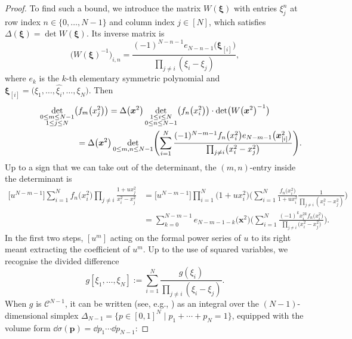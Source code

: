 \begin{proof}
To find such a bound, we introduce the matrix $W(\boldsymbol{\xi})$ with entries $\xi_j^{n}$ at row index $n \in \{0,\dots,N - 1\}$ and column index $j \in [N]$, which satisfies $\Delta(\boldsymbol{\xi}) = \det W(\boldsymbol{\xi})$. Its inverse matrix is
\[
\bigl(W(\boldsymbol{\xi})^{-1}\bigr)_{i,n} = \frac{(-1)^{N - n - 1}e_{N - n - 1}\bigl(\boldsymbol{\xi}_{[i]}\bigr)}{\prod_{j \neq i} (\xi_i - \xi_j)},
\]
where $e_k$ is the $k$-th elementary symmetric polynomial and $\boldsymbol{\xi}_{[i]} = \bigl(\xi_1,\dots,\widehat{\xi_i},\dots,\xi_N\bigr)$. Then
\begin{gather}
\nonumber \mathop{\det}_{\substack{0 \leq m \leq N - 1 \\ 1 \leq j \leq N }} \bigl(f_m\bigl(x_j^2\bigr)\bigr) = \Delta\bigl(\boldsymbol{x}^2\bigr) \det_{\substack{1 \leq i \leq N \\ 0 \leq n \leq N - 1}} \bigl(f_n\bigl(x_i^2\bigr)\bigr) \cdot \det \bigl(W\bigl(\boldsymbol{x}^2\bigr)^{-1}\bigr) \\
\hphantom{\mathop{\det}_{\substack{0 \leq m \leq N - 1 \\ 1 \leq j \leq N }} \bigl(f_m\bigl(x_j^2\bigr)\bigr)}{} = \Delta\bigl(\boldsymbol{x}^2\bigr) \det_{0 \leq m,n \leq N - 1} \Biggl(\sum_{i = 1}^{N} \frac{(-1)^{N - m - 1} f_n\bigl(x_i^2\bigr) e_{N - m - 1}\bigl(\boldsymbol{x}^2_{[i]}\bigr)}{\prod_{j \neq i} \bigl(x_i^2 - x_j^2\bigr)}\Biggr).\label{26}
\end{gather}
Up to a sign that we can take out of the determinant, the $(m,n)$-entry inside the determinant is
\begin{align*}
 \bigl[u^{N - m - 1}\bigr] \sum_{i = 1}^N f_n\bigl(x_i^2\bigr) \prod_{j \neq i} \frac{1 + ux_j^2}{x_i^2 - x_j^2} & = \bigl[u^{N - m - 1}\bigr] \prod_{i = 1}^N \bigl(1 + ux_i^2\bigr)\!\Biggl( \sum_{i = 1}^N \frac{f_n\bigl(x_i^2\bigr)}{1 + ux_i^2} \frac{1}{\prod_{j \neq i} (x_i^2 - x_j^2)}\Biggr) \\
& = \sum_{k = 0}^{N - m - 1} e_{N - m - 1 - k}\bigl(\boldsymbol{x}^2\bigr)\!\Biggl( \sum_{i = 1}^{N} \frac{(-1)^k x_i^{2k} f_{n}\bigl(x_i^2\bigr)}{\prod_{j \neq i} \bigl(x_i^2 - x_j^2\bigr)}\Biggr).
\end{align*}
In the first two steps, $[u^m]$ acting on the formal power series of $u$ to its right meant extracting the coefficient of $u^m$. Up to the use of squared variables, we recognise the divided difference
\[
g[\xi_1,\dots,\xi_N] := \sum_{i = 1}^N \frac{g(\xi_i)}{\prod_{j \neq i} (\xi_i - \xi_j)}.
\]
When $g$ is $\mathcal{C}^{N - 1}$, it can be written (see, e.g., \cite[Theorem 2, p.~250]{AnaN}) as an integral over the $(N - 1)$-dimensional simplex $\Delta_{N - 1} = \{p \in [0,1]^N \mid p_1 + \cdots + p_N = 1\}$, equipped with the volume form $\dd \sigma(\boldsymbol{p}) = \dd p_1 \cdots \dd p_{N - 1}$:

\end{proof}
